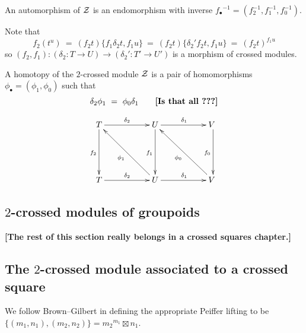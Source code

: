 \noindent
An automorphism of $\mathcal{Z}$ is an endomorphism with inverse
${f_{\bullet}}^{-1} = (f_2^{-1},f_1^{-1},f_0^{-1})$.

Note that
$$
f_2(t^u) ~=~ (f_2t)\{f_1\delta_2t,f_1u\}
         ~=~ (f_2t)\{\delta_2'f_2t,f_1u\}
         ~=~ (f_2t)^{f_1u}
$$
so $(f_2,f_1) : (\delta_2 : T \to U) \to (\delta_2' : T' \to U')$ 
is a morphism of crossed modules.

\begin{defn} 
A homotopy of the $2$-crossed module $\mathcal{Z}$
is a pair of homomorphisms $\phi_{\bullet} = (\phi_1,\phi_0)$
such that 
$$
\delta_2\phi_1 ~=~ \phi_0\delta_1 \qquad\mbox{{\bf [Is that all~???]}}
$$
\end{defn}
$$
\xymatrix{
    T \ar[rr]^{\delta_2} \ar[dd]_{f_2}
    &&  U \ar[rr]^{\delta_1} \ar[dd]_{f_1}
        && V~ \ar[dd]_{f_0} \\
    &&  &&  \\
    T \ar[rr]^{\delta_2} 
    &&  U \ar[rr]^{\delta_1} \ar[lluu]^{\phi_1}
        && V~ \ar[lluu]^{\phi_0}  \\
}
$$



\subsection{$2$-crossed modules of groupoids}  \label{subsec:2xmod-gpd}










\newpage
\vspace*{5mm}
\begin{center}
{\bf [The rest of this section really belongs in a crossed squares chapter.]}
\end{center}

\vspace*{10mm}
\subsection{The $2$-crossed module associated to a crossed square}

We follow Brown--Gilbert \cite{brow:gilb} in defining the appropriate 
Peiffer lifting to be 
$\{(m_1, n_1),(m_2,n_2) \} = {m_2}^{m_1} \boxtimes n_1$.

